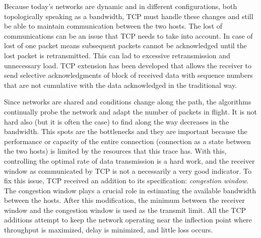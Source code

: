 Because today's networks are dynamic and in different configurations, both
topologically speaking as a  bandwidth, TCP must handle these changes and
still be able to maintain communication between the two hosts. The lost of
communications can be an issue that TCP needs to take into account. In case of
lost of one packet means subsequent packets cannot be acknowledged until the
lost packet is retransmitted. This can lad to excessive retransmission and
unnecessary load. TCP extension has been developed that allows the receiver to
send selective acknowledgments of block of received data with sequence numbers
that are not cumulative with the data acknowledged in the traditional
way\cite{RFC2018}.

Since networks are shared and conditions change along the path, the algorithms
continually probe the network and adapt the number of packets in flight. It is
not hard also (but it is often the case) to find along the way decreases in
the bandwidth. This spots are the bottlenecks and they are important because
the performance or capacity of the entire connection (connection as a state
between the two hosts) is limited by the resources that this trace has. With
this, controlling the optimal rate of data transmission is a hard work, and
the receiver window as communicated by TCP is not a necessarily a very good
indicator. To fix this issue, TCP received an addition to its specification:
\textit{congestion window}. The congestion window plays a crucial role in
estimating the available bandwidth between the hosts. After this modification,
the minimum between the receiver window and the congestion window is used as
the transmit limit. All the TCP additions attempt to keep the network
operating near the inflection point where throughput is maximized, delay is
minimized, and little loss occurs.
